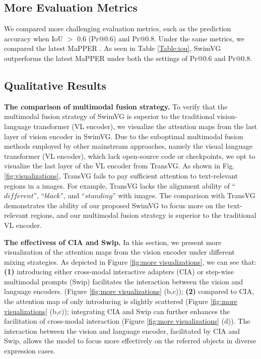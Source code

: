 \vspace{-4mm}
\subsection{More Evaluation Metrics}
We compared more challenging evaluation metrics, such as the prediction accuracy when IoU $>$ 0.6 (Pr@0.6) and Pr@0.8. Under the same metrics, we compared the latest MaPPER \cite{liu2024mapper}. As seen in Table \ref{Table:iou}, SwimVG outperforms the latest MaPPER under both the settings of Pr@0.6 and Pr@0.8.




\subsection{Qualitative Results}
\textbf{The comparison of multimodal fusion strategy.}
To verify that the multimodal fusion strategy of SwimVG is superior to the traditional vision-language transformer (VL encoder), we visualize the attention maps from the last layer of vision encoder in SwimVG. Due to the suboptimal multimodal fusion methods employed by other mainstream approaches, namely the visual language transformer (VL encoder), which lack open-source code or checkpoints, we opt to visualize the last layer of the VL encoder from TransVG. As shown in Fig.\ref{fig:visualizations}, TransVG fails to pay sufficient attention to text-relevant regions in a images. For example, TransVG lacks the alignment ability of ``$different$'', ``$black$'', and ``$standing$'' with images. The comparison with TransVG demonstrates the ability of our proposed SwimVG to focus more on the text-relevant regions, and our multimodal fusion strategy is superior to the traditional VL encoder.



\noindent
\textbf{The effectivess of CIA and Swip.}
In this section, we present more visualization of the attention maps from the vision encoder under different mixing strategies. As depicted in Figure \ref{fig:more visualizations}, we can see that: \textbf{(1)} introducing either cross-modal interactive adapters (CIA) or step-wise multimodal prompts (Swip) facilitates the interaction between the vision and language encoders. (Figure \ref{fig:more visualizations} (b,c)); \textbf{(2)} compared to CIA, the attention map of only introducing is slightly scattered (Figure \ref{fig:more visualizations} (b,c)); 
integrating CIA and Swip can further enhances the facilitation of cross-modal interaction (Figure \ref{fig:more visualizations} (d)). The interaction between the vision and language encoder, facilitated by CIA and Swip, allows the model to focus more effectively on the referred objects in diverse expression cases. 







